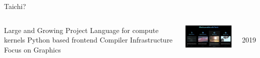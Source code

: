 \begin{frame}{Taichi?}
\begin{columns}
\centering
\begin{outline}
  \1 Large and Growing Project
  \1 Language for compute kernels
  \1 Python based frontend
  \1 Compiler Infrastructure
  \1 Focus on Graphics
\end{outline}
\vspace{0.5cm}
\includegraphics[width=5.5cm]{taichi_lang_whats_possible.png} 
\centering

\\
2019 \cite{Hu2019}

\end{columns}
\end{frame}
